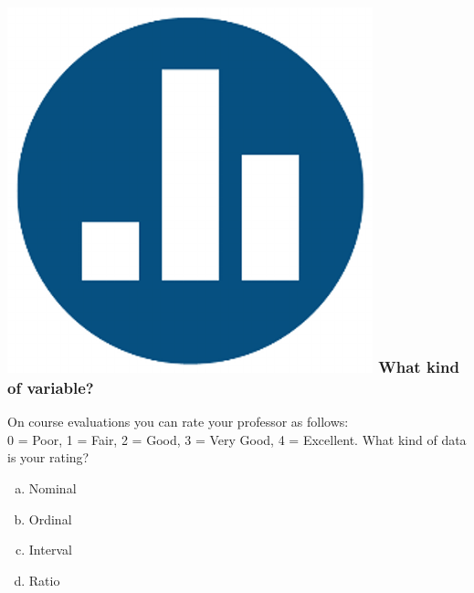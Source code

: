 \begin{frame}
\frametitle{\includegraphics[scale = 0.05]{./images/clicker} \hfill What kind of variable?}
On course evaluations you can rate your professor as follows:\\ 0 = Poor, 1 = Fair, 2 = Good,  3 = Very Good, 4 = Excellent. What kind of data is your rating?
	\begin{enumerate}[(a)]
\item Nominal
\item Ordinal
\item Interval
\item Ratio
\end{enumerate}
\end{frame}
